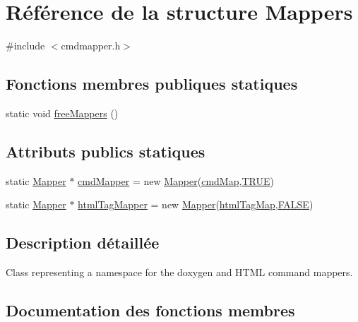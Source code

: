 \hypertarget{struct_mappers}{}\section{Référence de la structure Mappers}
\label{struct_mappers}


{\ttfamily \#include $<$cmdmapper.\+h$>$}

\subsection*{Fonctions membres publiques statiques}
\begin{DoxyCompactItemize}
\item 
static void \hyperlink{struct_mappers_aa2ba9c5371b148a67f2dbd2f85620968}{free\+Mappers} ()
\end{DoxyCompactItemize}
\subsection*{Attributs publics statiques}
\begin{DoxyCompactItemize}
\item 
static \hyperlink{class_mapper}{Mapper} $\ast$ \hyperlink{struct_mappers_a7f535b1382d0320d5ad22b75386da706}{cmd\+Mapper} = new \hyperlink{class_mapper}{Mapper}(\hyperlink{cmdmapper_8cpp_a7b8d3a6efe70667ff57a1000f0f9acc9}{cmd\+Map},\hyperlink{qglobal_8h_a04a6422a52070f0dc478693da640242b}{T\+R\+U\+E})
\item 
static \hyperlink{class_mapper}{Mapper} $\ast$ \hyperlink{struct_mappers_abeeec7950ae00f874c06bee2f04337ff}{html\+Tag\+Mapper} = new \hyperlink{class_mapper}{Mapper}(\hyperlink{cmdmapper_8cpp_a6ddce7306213db42fd60077a7f7142ad}{html\+Tag\+Map},\hyperlink{qglobal_8h_a10e004b6916e78ff4ea8379be80b80cc}{F\+A\+L\+S\+E})
\end{DoxyCompactItemize}


\subsection{Description détaillée}
Class representing a namespace for the doxygen and H\+T\+M\+L command mappers. 

\subsection{Documentation des fonctions membres}
\hypertarget{struct_mappers_aa2ba9c5371b148a67f2dbd2f85620968}{}
